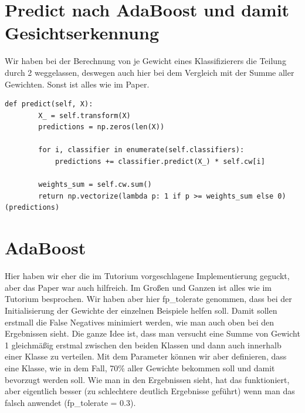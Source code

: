 \section*{Predict nach AdaBoost und damit Gesichtserkennung}
Wir haben bei der Berechnung von je Gewicht eines Klassifizierers die Teilung durch 2 weggelassen,
deswegen auch hier bei dem Vergleich mit der Summe aller Gewichten. Sonst ist alles wie im Paper.

\begin{lstlisting}[style=py]
    def predict(self, X):
        X_ = self.transform(X)
        predictions = np.zeros(len(X))

        for i, classifier in enumerate(self.classifiers):
            predictions += classifier.predict(X_) * self.cw[i]

        weights_sum = self.cw.sum()
        return np.vectorize(lambda p: 1 if p >= weights_sum else 0)(predictions)
\end{lstlisting}

\section*{AdaBoost}
Hier haben wir eher die im Tutorium vorgeschlagene Implementierung geguckt, aber das Paper war auch hilfreich.
Im Großen und Ganzen ist alles wie im Tutorium besprochen. Wir haben aber hier fp\_tolerate genommen, dass
bei der Initialisierung der Gewichte der einzelnen Beispiele helfen soll. Damit sollen erstmall die False Negatives
minimiert werden, wie man auch oben bei den Ergebnissen sieht. Die ganze Idee ist, dass man versucht eine Summe von
Gewicht 1 gleichmäßig erstmal zwischen den beiden Klassen und dann auch innerhalb einer Klasse zu verteilen. Mit
dem Parameter können wir aber definieren, dass eine Klasse, wie in dem Fall, 70\% aller Gewichte bekommen soll und
damit bevorzugt werden soll. Wie man in den Ergebnissen sieht, hat das funktioniert, aber eigentlich besser (zu
schlechtere deutlich Ergebnisse geführt) wenn man das falsch anwendet (fp\_tolerate = 0.3).

